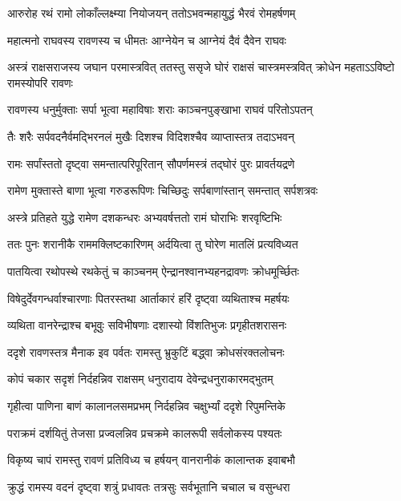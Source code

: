 \twolineshloka
{आरुरोह रथं रामो लोकाँल्लक्ष्म्या नियोजयन्}
{ततोऽभवन्महायुद्धं भैरवं रोमहर्षणम्} %

\twolineshloka
{महात्मनो राघवस्य रावणस्य च धीमतः}
{आग्नेयेन च आग्नेयं दैवं दैवेन राघवः} %

\threelineshloka
{अस्त्रं राक्षसराजस्य जघान परमास्त्रवित्}
{ततस्तु ससृजे घोरं राक्षसं चास्त्रमस्त्रवित्}
{क्रोधेन महताऽऽविष्टो रामस्योपरि रावणः} %

\twolineshloka
{रावणस्य धनुर्मुक्ताः सर्पा भूत्वा महाविषाः}
{शराः काञ्चनपुङ्खाभा राघवं परितोऽपतन्} %

\twolineshloka
{तैः शरैः सर्पवदनैर्वमद्भिरनलं मुखैः}
{दिशश्च विदिशश्चैव व्याप्तास्तत्र तदाऽभवन्} %

\twolineshloka
{रामः सर्पांस्ततो दृष्ट्वा समन्तात्परिपूरितान्}
{सौपर्णमस्त्रं तद्\mbox{}घोरं पुरः प्रावर्तयद्रणे} %

\twolineshloka
{रामेण मुक्तास्ते बाणा भूत्वा गरुडरूपिणः}
{चिच्छिदुः सर्पबाणांस्तान् समन्तात् सर्पशत्रवः} %

\twolineshloka
{अस्त्रे प्रतिहते युद्धे रामेण दशकन्धरः}
{अभ्यवर्षत्ततो रामं घोराभिः शरवृष्टिभिः} %

\twolineshloka
{ततः पुनः शरानीकै राममक्लिष्टकारिणम्}
{अर्दयित्वा तु घोरेण मातलिं प्रत्यविध्यत} %

\twolineshloka
{पातयित्वा रथोपस्थे रथकेतुं च काञ्चनम्}
{ऐन्द्रानश्वानभ्यहनद्रावणः क्रोधमूर्च्छितः} %

\twolineshloka
{विषेदुर्देवगन्धर्वाश्चारणाः पितरस्तथा}
{आर्ताकारं हरिं दृष्ट्वा व्यथिताश्च महर्षयः} %

\twolineshloka
{व्यथिता वानरेन्द्राश्च बभूवुः सविभीषणाः}
{दशास्यो विंशतिभुजः प्रगृहीतशरासनः} %

\twolineshloka
{ददृशे रावणस्तत्र मैनाक इव पर्वतः}
{रामस्तु भ्रुकुटिं बद्\mbox{}ध्वा क्रोधसंरक्तलोचनः} %

\twolineshloka
{कोपं चकार सदृशं निर्दहन्निव राक्षसम्}
{धनुरादाय देवेन्द्रधनुराकारमद्भुतम्} %

\twolineshloka
{गृहीत्वा पाणिना बाणं कालानलसमप्रभम्}
{निर्दहन्निव चक्षुर्भ्यां ददृशे रिपुमन्तिके} %

\twolineshloka
{पराक्रमं दर्शयितुं तेजसा प्रज्वलन्निव}
{प्रचक्रमे कालरूपी सर्वलोकस्य पश्यतः} %

\twolineshloka
{विकृष्य चापं रामस्तु रावणं प्रतिविध्य च}
{हर्षयन् वानरानीकं कालान्तक इवाबभौ} %

\twolineshloka
{क्रुद्धं रामस्य वदनं दृष्ट्वा शत्रुं प्रधावतः}
{तत्रसुः सर्वभूतानि चचाल च वसुन्धरा} %


